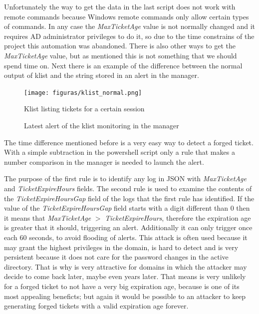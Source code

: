 
Unfortunately the way to get the data in the last script does not work with remote commands because Windows remote commands only allow certain types of commands. In any case the \textit{MaxTicketAge} value is not normally changed and it requires AD administrator privileges to do it, so due to the time constrains of the project this automation was abandoned. There is also other ways to get the \textit{MaxTicketAge} value, but as mentioned this is not something that we should spend time on.
\linej
\linej
Next there is an example of the difference between the normal output of klist and the string stored in an alert in the manager.

\begin{figure}[H]
	\centering
	\texttt{[image: figuras/klist\_normal.png]}
	\caption{Klist listing tickets for a certain session}
\end{figure}
\begin{figure}[H]
	\centering
	\caption{Latest alert of the klist monitoring in the manager}
\end{figure}
\linej
The time difference mentioned before is a very easy way to detect a forged ticket. With a simple subtraction in the powershell script only a rule that makes a number comparison in the manager is needed to launch the alert.
\linej

\linej
The purpose of the first rule is to identify any log in JSON with \textit{MaxTicketAge} and \textit{TicketExpireHours} fields. The second rule is used to examine the contents of the \textit{TicketExpireHoursGap} field of the logs that the first rule has identified. If the value of the \textit{TicketExpireHoursGap} field starts with a digit different than 0 then it means that \textit{MaxTicketAge} $>$ \textit{TicketExpireHours}, therefore the expiration age is greater that it should, triggering an alert.
Additionally it can only trigger once each 60 seconds, to avoid flooding of alerts.
\linej
\linej
This attack is often used because it may grant the highest privileges in the domain, is hard to detect and is very persistent because it does not care for the password changes in the active directory. That is why is very attractive for domains in which the attacker may decide to come back later, maybe even years later. That means is very unlikely for a forged ticket to not have a very big expiration age, because is one of its most appealing beneficts; but again it would be possible to an attacker to keep generating forged tickets with a valid expiration age forever.
